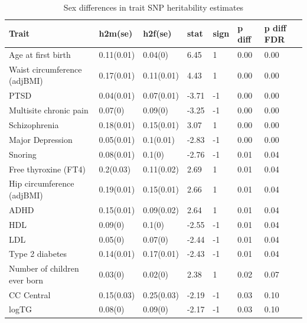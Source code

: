 \documentclass{article}\usepackage[]{graphicx}\usepackage[dvipsnames]{xcolor}
\begin{document}
\renewcommand{\arraystretch}{1.3}

% 
\setcounter{table}{0}
\renewcommand{\tablename}{Supplementary Table} %

\begin{longtable}{p{6cm}|p{1.5cm}|p{1.5cm}|p{1.5cm}|p{1.5cm}|p{1.5cm}|p{1.5cm}}
\caption{Sex differences in trait SNP heritability estimates}\\
  \hline
Trait & h2m(se) & h2f(se) & stat & sign & p diff & p diff FDR \\ 
  \hline
Age at first birth & 0.11(0.01) & 0.04(0) & 6.45 &   1 & 0.00 & 0.00 \\ 
  Waist circumference (adjBMI) & 0.17(0.01) & 0.11(0.01) & 4.43 &   1 & 0.00 & 0.00 \\ 
  PTSD & 0.04(0.01) & 0.07(0.01) & -3.71 &  -1 & 0.00 & 0.00 \\ 
  Multisite chronic pain & 0.07(0) & 0.09(0) & -3.25 &  -1 & 0.00 & 0.00 \\ 
  Schizophrenia & 0.18(0.01) & 0.15(0.01) & 3.07 &   1 & 0.00 & 0.00 \\ 
  Major Depression & 0.05(0.01) & 0.1(0.01) & -2.83 &  -1 & 0.00 & 0.00 \\ 
  Snoring & 0.08(0.01) & 0.1(0) & -2.76 &  -1 & 0.01 & 0.04 \\ 
  Free thyroxine (FT4) & 0.2(0.03) & 0.11(0.02) & 2.69 &   1 & 0.01 & 0.04 \\ 
  Hip circumference (adjBMI) & 0.19(0.01) & 0.15(0.01) & 2.66 &   1 & 0.01 & 0.04 \\ 
  ADHD & 0.15(0.01) & 0.09(0.02) & 2.64 &   1 & 0.01 & 0.04 \\ 
  HDL & 0.09(0) & 0.1(0) & -2.55 &  -1 & 0.01 & 0.04 \\ 
  LDL & 0.05(0) & 0.07(0) & -2.44 &  -1 & 0.01 & 0.04 \\ 
  Type 2 diabetes & 0.14(0.01) & 0.17(0.01) & -2.43 &  -1 & 0.01 & 0.04 \\ 
  Number of children ever born & 0.03(0) & 0.02(0) & 2.38 &   1 & 0.02 & 0.07 \\ 
  CC Central & 0.15(0.03) & 0.25(0.03) & -2.19 &  -1 & 0.03 & 0.10 \\ 
  logTG & 0.08(0) & 0.09(0) & -2.17 &  -1 & 0.03 & 0.10 \\ 
   \hline
 \end{longtable}


 
\end{document}
